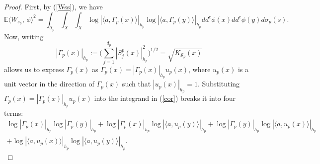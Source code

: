\documentclass[11pt,leqno,oneside]{amsart}
\numberwithin{equation}{section}
\begin{document}
\begin{proof}
First, by (\ref{Wss}), we have
\begin{equation}\label{cor}
	\mathbb{E}\langle W_{s_{p}}, \, \phi \rangle ^{2}= \int_{\mathcal{S}_{p}}\int_{X}\int_{X}{\log{|\langle a, \Gamma_{p}(x) \rangle|_{h_{p}}}\log{|\langle a, \Gamma_{p}(y) \rangle|_{h_{p}}}dd^{c}\phi(x)dd^{c}\phi(y)d\sigma_{p}(s)}.
\end{equation}
Now, writing
$$
|\Gamma_{p}(x)|_{h_{p}} := \Big(\sum_{j=1}^{d_{p}}{|S^{p}_{j}(x)|^{2}_{h_{p}}}\Big)^{1/2} = \sqrt{K_{\mathcal{S}_{p}}(x)}
$$
allows us to express \( \Gamma_{p}(x) \) as \( \Gamma_{p}(x) = |\Gamma_{p}(x)|_{h_{p}} u_{p}(x) \), where \( u_{p}(x) \) is a unit vector in the direction of \( \Gamma_{p}(x) \) such that \( |u_{p}(x)|_{h_{p}} = 1 \). Substituting \( \Gamma_{p}(x) = |\Gamma_{p}(x)|_{h_{p}} u_{p}(x) \) into the integrand in (\ref{cor}) breaks it into four terms:
\begin{align}
\log{|\Gamma_{p}(x)|_{h_{p}}}\log{|\Gamma_{p}(y)|_{h_{p}}}+ \log{|\Gamma_{p}(x)|_{h_{p}}}\log{| \langle a, u_{p}(y)\rangle|_{h_{p}}} +  \log{|\Gamma_{p}(y)|_{h_{p}}}\log{| \langle a, u_{p}(x)\rangle|_{h_{p}}}
 \label{forones1} \\ \label{forones} +\log{| \langle a, u_{p}(x)\rangle|_{h_{p}}}\log{| \langle a, u_{p}(y)\rangle|_{h_{p}}}. \nonumber
\end{align}


\end{proof}
\end{document}
